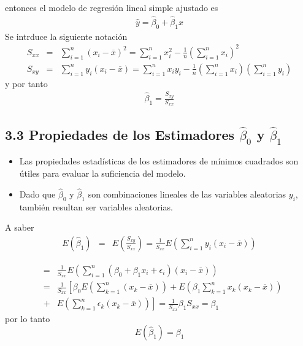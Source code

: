 entonces el modelo de regresi\'on lineal simple ajustado es
\begin{eqnarray}
\hat{y}=\hat{\beta}_{0}+\hat{\beta}_{1}x
\end{eqnarray}
Se intrduce la siguiente notaci\'on
\begin{eqnarray}
S_{xx}&=&\sum_{i=1}^{n}\left(x_{i}-\overline{x}\right)^{2}=\sum_{i=1}^{n}x_{i}^{2}-\frac{1}{n}\left(\sum_{i=1}^{n}x_{i}\right)^{2}\\
S_{xy}&=&\sum_{i=1}^{n}y_{i}\left(x_{i}-\overline{x}\right)=\sum_{i=1}^{n}x_{i}y_{i}-\frac{1}{n}\left(\sum_{i=1}^{n}x_{i}\right)\left(\sum_{i=1}^{n}y_{i}\right)
\end{eqnarray}
y por tanto
\begin{eqnarray}
\hat{\beta}_{1}=\frac{S_{xy}}{S_{xx}}
\end{eqnarray}





\subsection{3.3 Propiedades de los Estimadores $\hat{\beta}_{0}$ y $\hat{\beta}_{1}$}





\begin{Note}
\begin{itemize}
\item Las propiedades estad\'isticas de los estimadores de m\'inimos cuadrados son \'utiles para evaluar la suficiencia del modelo.

\item Dado que $\hat{\beta}_{0}$ y  $\hat{\beta}_{1}$ son combinaciones lineales de las variables aleatorias $y_{i}$, tambi\'en resultan ser variables aleatorias.
\end{itemize}
\end{Note}
A saber
\begin{eqnarray*}
E\left(\hat{\beta}_{1}\right)&=&E\left(\frac{S_{xy}}{S_{xx}}\right)=\frac{1}{S_{xx}}E\left(\sum_{i=1}^{n}y_{i}\left(x_{i}-\overline{x}\right)\right)
\end{eqnarray*}






\begin{eqnarray*}
&=&\frac{1}{S_{xx}}E\left(\sum_{i=1}^{n}\left(\beta_{0}+\beta_{1}x_{i}+\epsilon_{i}\right)\left(x_{i}-\overline{x}\right)\right)\\
&=&\frac{1}{S_{xx}}\left[\beta_{0}E\left(\sum_{k=1}^{n}\left(x_{k}-\overline{x}\right)\right)+E\left(\beta_{1}\sum_{k=1}^{n}x_{k}\left(x_{k}-\overline{x}\right)\right)\right.\\
&+&\left.E\left(\sum_{k=1}^{n}\epsilon_{k}\left(x_{k}-\overline{x}\right)\right)\right]=\frac{1}{S_{xx}}\beta_{1}S_{xx}=\beta_{1}
\end{eqnarray*}
por lo tanto 
\begin{equation}\label{Esperanza.Beta.1}
E\left(\hat{\beta}_{1}\right)=\beta_{1}
\end{equation}







